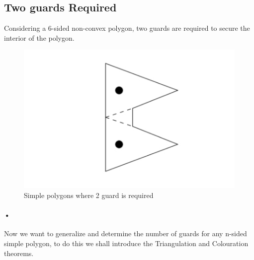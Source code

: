 \documentclass[10pt,a4paper]{article}
\begin{document}
\subsection{Two guards Required}
Considering a 6-sided non-convex polygon, two guards are required to secure the interior of the polygon.

\begin{figure}[h!]\label{2guard}
\centering
\includegraphics[scale=0.5]{2.jpg}
\caption{Simple polygons where 2 guard is required}
\end{figure}
\paragraph{•}
Now we want to generalize and determine the number of guards for any n-sided simple polygon, to do this we shall introduce the Triangulation and Colouration theorems.
\end{document}

